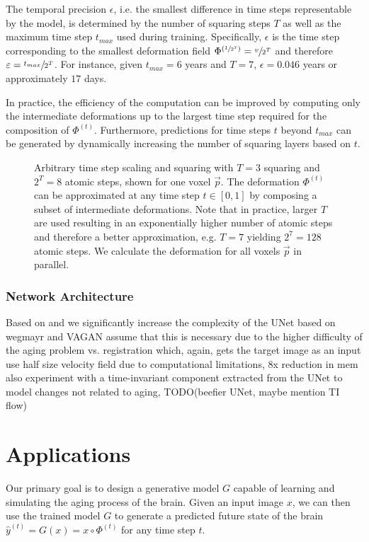 The temporal precision $\epsilon$, i.e. the smallest difference in time steps representable by the model, is determined by the number of squaring steps $T$ as well as the maximum time step $t_{max}$ used during training. Specifically, $\epsilon$ is the time step corresponding to the smallest deformation field $\Phi^{(\sfrac{1}{2^T})} = \sfrac{v}{2^T}$ and therefore $\varepsilon = \sfrac{t_{max}}{2^T}$. For instance, given $t_{max} = 6$ years and $T = 7$, $\epsilon = 0.046$ years or approximately $17$ days.

In practice, the efficiency of the computation can be improved by computing only the intermediate deformations up to the largest time step required for the composition of $\Phi^{(t)}$. Furthermore, predictions for time steps $t$ beyond $t_{max}$ can be generated by dynamically increasing the number of squaring layers based on $t$.



\begin{figure}
	\centering
	
	\caption{Arbitrary time step scaling and squaring with $T = 3$ squaring and $ 2^T = 8 $ atomic steps, shown for one voxel $ \vec p $. The deformation $ \Phi^{(t)} $ can be approximated at any time step $ t \in [0, 1] $ by composing a subset of intermediate deformations. Note that in practice, larger $T$ are used resulting in an exponentially higher number of atomic steps and therefore a better approximation, e.g. $T = 7$ yielding $ 2^7 = 128 $ atomic steps. We calculate the deformation for all voxels $ \vec{p} $ in parallel.} \label{fig:arbtimestep}
\end{figure}

\subsection{Network Architecture}
Based on \cite{wegmayr} and \cite{baumgartner} we significantly increase the complexity of the UNet based on wegmayr and VAGAN
assume that this is necessary due to the higher difficulty of the aging problem vs. registration which, again, gets the target image as an input
use half size velocity field due to computational limitations, 8x reduction in mem
also experiment with a time-invariant component extracted from the UNet to model changes not related to aging,
TODO(beefier UNet, maybe mention TI flow)

\chapter{Applications}
Our primary goal is to design a generative model $G$ capable of learning and simulating the aging process of the brain. Given an input image $x$, we can then use the trained model $G$ to generate a predicted future state of the brain $\hat y^{(t)} = G(x) = x \circ \Phi^{(t)}$ for any time step $t$.

